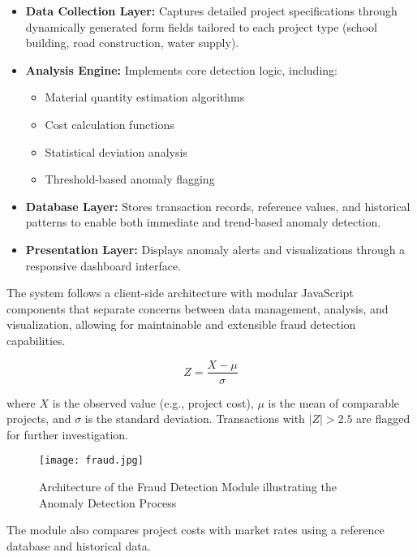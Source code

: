 \documentclass[12pt,a4paper]{report}
\begin{document}
\begin{itemize}
    \item \textbf{Data Collection Layer:} Captures detailed project specifications through dynamically generated form fields tailored to each project type (school building, road construction, water supply).
    \item \textbf{Analysis Engine:} Implements core detection logic, including:
    \begin{itemize}
        \item Material quantity estimation algorithms
        \item Cost calculation functions
        \item Statistical deviation analysis
        \item Threshold-based anomaly flagging
    \end{itemize}
    \item \textbf{Database Layer:} Stores transaction records, reference values, and historical patterns to enable both immediate and trend-based anomaly detection.
    \item \textbf{Presentation Layer:} Displays anomaly alerts and visualizations through a responsive dashboard interface.
\end{itemize}

\indent The system follows a client-side architecture with modular JavaScript components that separate concerns between data management, analysis, and visualization, allowing for maintainable and extensible fraud detection capabilities.



\begin{equation}
Z = \frac{X - \mu}{\sigma}
\end{equation}

\noindent where $X$ is the observed value (e.g., project cost), $\mu$ is the mean of comparable projects, and $\sigma$ is the standard deviation. Transactions with $|Z| > 2.5$ are flagged for further investigation.

\begin{figure}[H]
    \centering
    \texttt{[image: fraud.jpg]}
    \caption{Architecture of the Fraud Detection Module illustrating the Anomaly Detection Process}
    \label{fig:fraud}
\end{figure}


\noindent The module also compares project costs with market rates using a reference database and historical data.
\end{document}
